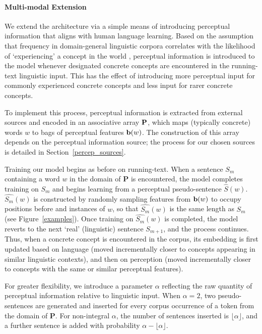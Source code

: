 \paragraph{Multi-modal Extension} We extend the \cite{mikolov2013efficient} architecture via a simple means of introducing perceptual information that aligns with human language learning. Based on the assumption that frequency in domain-general linguistic corpora correlates with the likelihood of `experiencing' a concept in the world \cite{bybee2001frequency,chater2006probabilistic}, perceptual information is introduced to the model whenever designated concrete concepts are encountered in the running-text linguistic input. This has the effect of introducing more perceptual input for commonly experienced concrete concepts and less input for rarer concrete concepts. 

To implement this process,  perceptual information is extracted from external sources and encoded in an associative array \(\bf{P}\), which maps (typically concrete) words \(w\) to bags of perceptual features \({\bf b}(w)\). The construction of this array depends on the perceptual information source; the process for our chosen sources is detailed in Section~\ref{percep_sources}.  

Training our model begins as before on running-text. When a sentence \(S_m\) containing a word \(w\) in the domain of \(\mathbf{P}\) is encountered, the model completes training on \(S_m\) and begins learning from a perceptual pseudo-sentence \(\hat{S}(w)\).  \(\hat{S_m}(w)\) is constructed  by randomly sampling features from \({\bf b}(w)\) to occupy positions before and instances of \(w\), so that  \(\hat{S_m}(w)\) is the same length as \(S_m\) (see Figure~\ref{examples}). Once training on \(\hat{S_m}(w)\) is completed, the model reverts to the next `real' (linguistic) sentence \(S_{m+1}\), and the process continues. Thus, when a concrete concept is encountered in the corpus, its embedding is first updated based on language (moved incrementally closer to concepts appearing in similar linguistic contexts), and then on perception (moved incrementally closer to concepts with the same or similar perceptual features).  

For greater flexibility, we introduce a parameter \(\alpha\) reflecting the raw quantity of perceptual information relative to linguistic input. When \(\alpha=2\), two pseudo-sentences are generated and inserted for every corpus occurrence of a token from the domain of \(\mathbf{P}\). For non-integral \(\alpha \), the number of sentences inserted is \( \lfloor \alpha \rfloor \), and a further sentence is added with probability \(\alpha - \lfloor \alpha \rfloor \).

